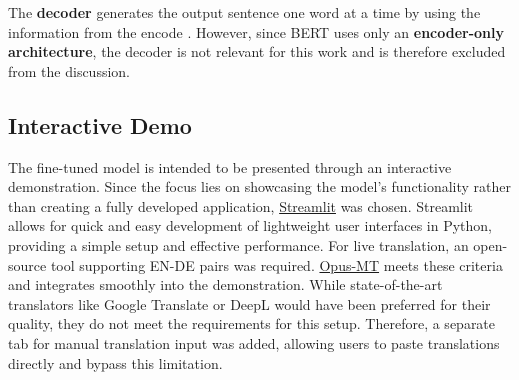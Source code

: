 The \textbf{decoder} generates the output sentence one word at a time by using the information from the encode \citep{xiaoIntroductionTransformersNLP2023}. However, since BERT uses only an \textbf{encoder-only architecture}, the decoder is not relevant for this work and is therefore excluded from the discussion.

\subsection{Interactive Demo}
The fine-tuned model is intended to be presented through an interactive demonstration. Since the focus lies on showcasing the model’s functionality rather than creating a fully developed application, \href{https://streamlit.io/}{Streamlit} was chosen. Streamlit allows for quick and easy development of lightweight user interfaces in Python, providing a simple setup and effective performance. For live translation, an open-source tool supporting EN-DE pairs was required. \href{https://github.com/Helsinki-NLP/Opus-MT}{Opus-MT} \citep{tiedemannOPUSMTBuildingOpen2020} meets these criteria and integrates smoothly into the demonstration. While state-of-the-art translators like Google Translate or DeepL would have been preferred for their quality, they do not meet the requirements for this setup. Therefore, a separate tab for manual translation input was added, allowing users to paste translations directly and bypass this limitation.
